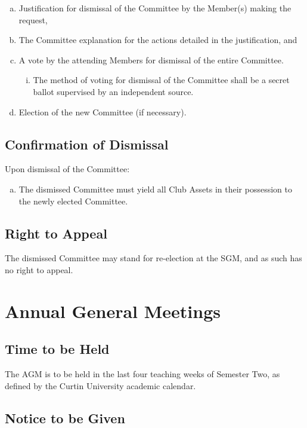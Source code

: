 \documentclass[a4paper,12pt]{article}
\begin{document}
\begin{enumerate}[a)]
	\item Justification for dismissal of the Committee by the Member(s) making the request,
	\item The Committee explanation for the actions detailed in the justification, and
	\item A vote by the attending Members for dismissal of the entire Committee.
	\begin{enumerate}[i)]
		\item The method of voting for dismissal of the Committee shall be a secret ballot supervised by an independent source.
	\end{enumerate}
	\item Election of the new Committee (if necessary).
\end{enumerate}

\subsection{Confirmation of Dismissal}

Upon dismissal of the Committee:

\begin{enumerate}[a)]
	\item The dismissed Committee must yield all Club Assets in their possession to the newly elected Committee.
\end{enumerate}

\subsection{Right to Appeal}

The dismissed Committee may stand for re-election at the SGM, and as such has no right to appeal.

\section{Annual General Meetings}

\subsection{Time to be Held}

The AGM is to be held in the last four teaching weeks of Semester Two, as defined by the Curtin University academic calendar.

\subsection{Notice to be Given}
\end{document}
